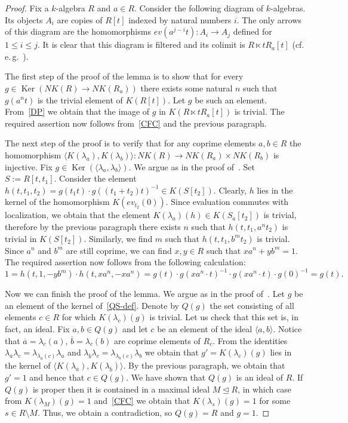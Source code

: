 \documentclass[oneside, 11pt]{amsart} \pdfoutput=1
\newcommand{\Ker}{\mathop{\mathrm{Ker}}\nolimits}
\numberwithin{equation}{section}
\theoremstyle{definition}
\begin{document}
\begin{proof}
 Fix a $k$-algebra $R$ and $a \in R$. 
 Consider the following diagram of $k$-algebras. Its objects $A_i$ are copies of $R[t]$ indexed by natural numbers $i$. The only arrows of this diagram are the homomorphisms $ev (a^{j-i}t)\colon A_i \to A_j$ defined for $1 \leq i \leq j$. It is clear that this diagram is filtered and its colimit is $R \ltimes tR_a[t]$ (cf. e.\,g.~\cite[Lemma~15]{S15}). 
 
 The first step of the proof of the lemma is to show that for every $g \in \Ker(NK(R) \to NK(R_a))$ there exists some natural $n$ such that $g(a^nt)$ is the trivial element of $K(R[t])$. Let $g$ be such an element. From~\ref{DP} we obtain that the image of $g$ in $K(R \ltimes tR_a[t])$ is trivial. The required assertion now follows from~\ref{CFC} and the previous paragraph.
 
 The next step of the proof is to verify that for any coprime elements $a, b \in R$ the homomorphism $\langle K(\lambda_a), K(\lambda_b) \rangle \colon NK(R) \to NK(R_a) \times NK(R_b)$ is injective. Fix $g \in \Ker(\langle \lambda_a, \lambda_b \rangle)$. We argue as in the proof of~\cite[Lemma~2.5]{Tu83}. Set $S := R[t, t_1]$. Consider the element $h(t, t_1, t_2) = g(t_1 t) \cdot g((t_1 + t_2)t)^{-1}\in K(S[t_2]).$ Clearly, $h$ lies in the kernel of the homomorphism $K(ev_{t_2}(0))$. Since evaluation commutes with localization, we obtain that the element $K(\lambda_a)(h) \in K(S_a[t_2])$ is trivial, therefore by the previous paragraph there exists $n$ such that $h(t, t_1, a^nt_2)$ is trivial in $K(S[t_2])$. Similarly, we find $m$ such that $h(t, t_1, b^m t_2)$ is trivial. Since $a^n$ and $b^m$ are still coprime, we can find $x, y \in R$ such that $xa^n + yb^m = 1$. The required assertion now follows from the following calculation:
 $$1 = h(t, 1, -yb^m) \cdot h(t, xa^n, -xa^n) = g(t)\cdot g(xa^n\cdot t)^{-1} \cdot g(xa^n\cdot t) \cdot g(0)^{-1} = g(t).$$
 
 Now we can finish the proof of the lemma. We argue as in the proof of~\cite[Theorem~2]{S15}. Let $g$ be an element of the kernel of~\eqref{QS-def}. Denote by $Q(g)$ the set consisting of all elements $c \in R$ for which $K(\lambda_c)(g)$ is trivial. Let us check that this set is, in fact, an ideal. Fix $a, b \in Q(g)$ and let $c$ be an element of the ideal $\langle a, b \rangle$. Notice that $\overline{a} = \lambda_c(a)$, $\overline{b} = \lambda_c(b)$ are coprime elements of $R_c$. From the identities $\lambda_{\overline{a}}\lambda_c = \lambda_{\lambda_a(c)}\lambda_a$ and $\lambda_{\overline{b}}\lambda_c = \lambda_{\lambda_b(c)}\lambda_b$ we obtain that $g' = K(\lambda_c)(g)$ lies in the kernel of $\langle K(\lambda_{\overline{a}}), K(\lambda_{\overline{b}}) \rangle.$ By the previous paragraph, we obtain that $g' = 1$ and hence that $c \in Q(g)$. We have shown that $Q(g)$ is an ideal of $R$. If $Q(g)$ is proper then it is contained in a maximal ideal $M \trianglelefteq R$, in which case from $K(\lambda_M)(g) = 1$ and~\ref{CFC} we obtain that $K(\lambda_s)(g) = 1$ for some $s \in R \setminus M$. Thus, we obtain a contradiction, so $Q(g) = R$ and $g = 1$.
\end{proof}
\end{document}
